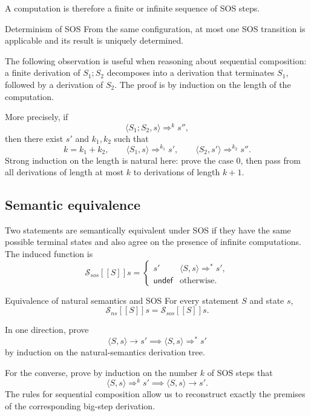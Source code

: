 \documentclass[a4paper]{article}
\newcommand{\undefined}{\mathsf{undef}}
\newcommand{\sem}[1]{[\![#1]\!]}
\begin{document}
A computation is therefore a finite or infinite sequence of SOS steps.

\begin{snippettheorem}{Determinism of SOS}
    From the same configuration, at most one SOS transition is applicable and its result is uniquely determined.
\end{snippettheorem}

The following observation is useful when reasoning about sequential composition: a finite derivation of \(S_1;S_2\) decomposes into a derivation that terminates \(S_1\), followed by a derivation of \(S_2\).
The proof is by induction on the length of the computation.

More precisely, if
\[
    \langle S_1;S_2,s\rangle\Rightarrow^k s'',
\]
then there exist \(s'\) and \(k_1,k_2\) such that
\[
    k=k_1+k_2,
    \qquad
    \langle S_1,s\rangle\Rightarrow^{k_1}s',
    \qquad
    \langle S_2,s'\rangle\Rightarrow^{k_2}s''.
\]
Strong induction on the length is natural here: prove the case \(0\), then pass from all derivations of length at most \(k\) to derivations of length \(k+1\).

\subsection{Semantic equivalence}

Two statements are semantically equivalent under SOS if they have the same possible terminal states and also agree on the presence of infinite computations.
The induced function is
\[
    \mathcal S_{sos}\sem{S}s
    =
    \begin{cases}
        s' & \langle S,s\rangle\Rightarrow^* s',\\
        \undefined & \text{otherwise}.
    \end{cases}
\]

\begin{snippettheorem}{Equivalence of natural semantics and SOS}
    For every statement \(S\) and state \(s\),
    \[
        \mathcal S_{ns}\sem{S}s
        =
        \mathcal S_{sos}\sem{S}s.
    \]
\end{snippettheorem}

\begin{snippetproof}{}
    In one direction, prove
    \[
        \langle S,s\rangle\to s'
        \implies
        \langle S,s\rangle\Rightarrow^*s'
    \]
    by induction on the natural-semantics derivation tree.

    For the converse, prove by induction on the number \(k\) of SOS steps that
    \[
        \langle S,s\rangle\Rightarrow^k s'
        \implies
        \langle S,s\rangle\to s'.
    \]
    The rules for sequential composition allow us to reconstruct exactly the premises of the corresponding big-step derivation.
\end{snippetproof}
\end{document}
